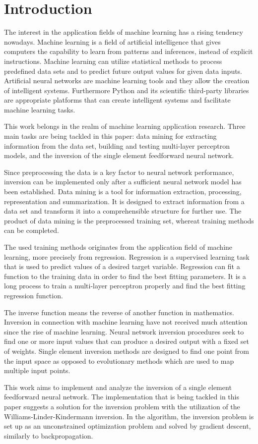 \chapter{Introduction}

The interest in the application fields of machine learning has a rising tendency nowadays. Machine learning is a field of artificial intelligence that gives computers the capability to learn from patterns and inferences, instead of explicit instructions. Machine learning can utilize statistical methods to process predefined data sets and to predict future output values for given data inputs. Artificial neural networks are machine learning tools and they allow the creation of intelligent systems. Furthermore Python and its scientific third-party libraries are appropriate platforms that can create intelligent systems and facilitate machine learning tasks.\medskip

This work belongs in the realm of machine learning application research. Three main tasks are being tackled in this paper: data mining for extracting information from the data set, building and testing multi-layer perceptron models, and the inversion of the single element feedforward neural network.\medskip

Since preprocessing the data is a key factor to neural network performance, inversion can be implemented only after a sufficient neural network model has been established. Data mining is a tool for information extraction, processing, representation and summarization. It is designed to extract information from a data set and transform it into a comprehensible structure for further use. The product of data mining is the preprocessed training set, whereat training methods can be completed.\medskip

The used training methods originates from the application field of machine learning, more precisely from regression. Regression is a supervised learning task that is used to predict values of a desired target variable. Regression can fit a function to the training data in order to find the best fitting parameters. It is a long process to train a multi-layer perceptron properly and find the best fitting regression function. \medskip

The inverse function means the reverse of another function in mathematics. Inversion in connection with machine learning have not received much attention since the rise of machine learning. Neural network inversion procedures seek to find one or more input values that can produce a desired output with a fixed set of weights. Single element inversion methods are designed to find one point from the input space as opposed to evolutionary methods which are used to map multiple input points. \medskip

This work aims to implement and analyze the inversion of a single element feedforward neural network. The implementation that is being tackled in this paper suggests a solution for the inversion problem with the utilization of the Williams-Linder-Kindermann inversion. In the algorithm, the inversion problem is set up as an unconstrained optimization problem and solved by gradient descent, similarly to backpropagation.

